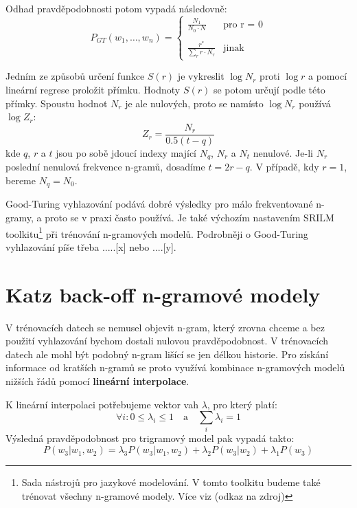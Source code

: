 \documentclass[12pt,a4paper]{report}
\begin{document}
Odhad pravděpodobnosti potom vypadá následovně:
\begin{equation}
P_{GT}(w_{1},\ldots,w_{n}) = \left\{
\begin{array}{ll}
\displaystyle \frac{N_1}{N_0 \cdot N} & \text{pro r = 0} \\
&\\
\displaystyle \frac{r^*}{\sum_{r}r\cdot N_r} & \text{jinak} 
\end{array}\right.
\end{equation}

Jedním ze způsobů určení funkce $S(r)$ je vykreslit $\log N_r$ proti $\log r$ a pomocí lineární regrese proložit přímku. Hodnoty $S(r)$ se potom určují podle této přímky. Spoustu hodnot $N_r$ je ale nulových, proto se namísto $\log N_r$ používá $\log Z_r$:
\begin{equation}
Z_r = \frac{N_r}{0.5(t-q)}
\end{equation}
kde $q$, $r$ a $t$ jsou po sobě jdoucí indexy mající $N_q$, $N_r$ a $N_t$ nenulové. Je-li $N_r$ poslední nenulová frekvence n-gramů, dosadíme $t = 2r - q$. V případě, kdy $r = 1$, bereme $N_q = N_0$.

Good-Turing vyhlazování podává dobré výsledky pro málo frekventované n-gramy, a proto se v praxi často používá. Je také výchozím nastavením SRILM toolkitu\footnote{Sada nástrojů pro jazykové modelování. V tomto toolkitu budeme také trénovat všechny n-gramové modely. Více viz (odkaz na zdroj)} při trénování n-gramových modelů. Podrobněji o Good-Turing vyhlazování píše třeba .....[x] nebo ....[y].

\section{Katz back-off n-gramové modely}
V trénovacích datech se nemusel objevit n-gram, který zrovna chceme a bez použití vyhlazování bychom dostali nulovou pravděpodobnost. V trénovacích datech ale mohl být podobný n-gram lišící se jen délkou historie. Pro získání informace od kratších n-gramů se proto využívá kombinace n-gramových modelů nižších řádů pomocí \textbf{lineární interpolace}. 

K lineární interpolaci potřebujeme vektor vah $\lambda$, pro který platí:
\begin{equation}
\forall i : 0 \leq \lambda_i \leq 1 \quad \text{a} \quad \sum_{i} \lambda_i = 1
\end{equation}
Výsledná pravděpodobnost pro trigramový model pak vypadá takto:
\begin{equation}
P(w_3|w_1, w_2) = \lambda_3 P(w_3|w_1,w_2) + \lambda_2 P(w_3|w_2) + \lambda_1 P(w_3)
\end{equation}
\end{document}
